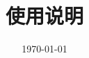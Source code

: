 \documentclass[
class = book,
zihao = -4,
font = noto,
paper = a4paper,
openany
]{easybook}
\begin{document}
	\title{\Name\ \Version \\ 使用说明}
	\date{\today}
	
	\frontmatter[roman]
	\maketitle
	\tableofcontents
	
	\mainmatter*
	
	
	
	
	
	\newpage
	
	\backmatter
\end{document}
